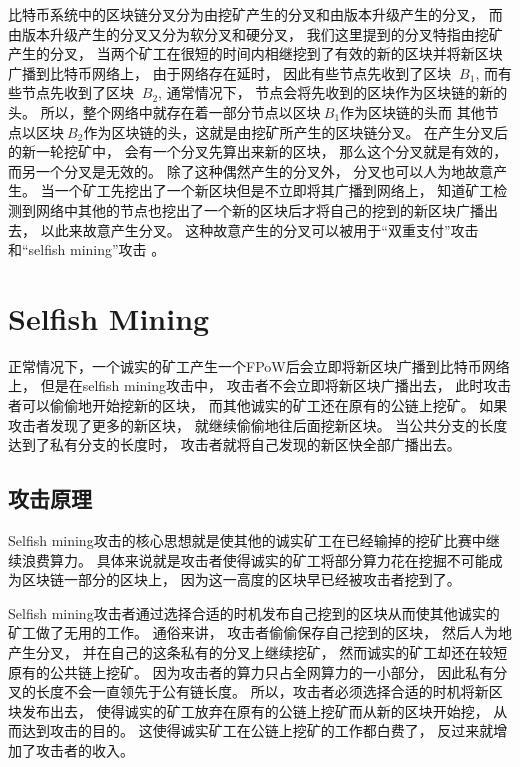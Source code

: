 \documentclass[a4paper, 11pt]{article}
\begin{document}
\begin{CJK*}{UTF8}{gbsn}
    \indent

    比特币系统中的区块链分叉分为由挖矿产生的分叉\cite{ref_web3}和由版本升级产生的分叉\cite{ref_web4}，
    而由版本升级产生的分叉又分为软分叉和硬分叉，
    我们这里提到的分叉特指由挖矿产生的分叉，
    当两个矿工在很短的时间内相继挖到了有效的新的区块并将新区块广播到比特币网络上，
    由于网络存在延时，
    因此有些节点先收到了区块 $\ B_1$,
    而有些节点先收到了区块 $\ B_2$,
    通常情况下，
    节点会将先收到的区块作为区块链的新的头。
    所以，整个网络中就存在着一部分节点以区块$\ B_1$作为区块链的头而
    其他节点以区块$\ B_2$作为区块链的头，这就是由挖矿所产生的区块链分叉。
    在产生分叉后的新一轮挖矿中，
    会有一个分叉先算出来新的区块，
    那么这个分叉就是有效的，
    而另一个分叉是无效的。
    除了这种偶然产生的分叉外，
    分叉也可以人为地故意产生。
    当一个矿工先挖出了一个新区块但是不立即将其广播到网络上，
    知道矿工检测到网络中其他的节点也挖出了一个新的区块后才将自己的挖到的新区块广播出去，
    以此来故意产生分叉。
    这种故意产生的分叉可以被用于“双重支付”攻击\cite{ref_double_spending}和“selfish mining”攻击
    \cite{ref_selfish_mining1, ref_selfish_mining2, ref_selfish_mining3}。

    \section{Selfish Mining}

    \indent

    正常情况下，一个诚实的矿工产生一个FPoW后会立即将新区块广播到比特币网络上，
    但是在selfish mining攻击\cite{ref_selfish_mining1}中，
    攻击者不会立即将新区块广播出去，
    此时攻击者可以偷偷地开始挖新的区块，
    而其他诚实的矿工还在原有的公链上挖矿。
    如果攻击者发现了更多的新区块，
    就继续偷偷地往后面挖新区块。
    当公共分支的长度达到了私有分支的长度时，
    攻击者就将自己发现的新区快全部广播出去。

    \subsection{攻击原理}

    \indent

    Selfish mining攻击的核心思想就是使其他的诚实矿工在已经输掉的挖矿比赛中继续浪费算力。
    具体来说就是攻击者使得诚实的矿工将部分算力花在挖掘不可能成为区块链一部分的区块上，
    因为这一高度的区块早已经被攻击者挖到了。

    Selfish mining攻击者通过选择合适的时机发布自己挖到的区块从而使其他诚实的矿工做了无用的工作。
    通俗来讲，
    攻击者偷偷保存自己挖到的区块，
    然后人为地产生分叉，
    并在自己的这条私有的分叉上继续挖矿，
    然而诚实的矿工却还在较短原有的公共链上挖矿。
    因为攻击者的算力只占全网算力的一小部分，
    因此私有分叉的长度不会一直领先于公有链长度。
    所以，攻击者必须选择合适的时机将新区块发布出去，
    使得诚实的矿工放弃在原有的公链上挖矿而从新的区块开始挖，
    从而达到攻击的目的。
    这使得诚实矿工在公链上挖矿的工作都白费了，
    反过来就增加了攻击者的收入。


\end{CJK*}
\end{document}
